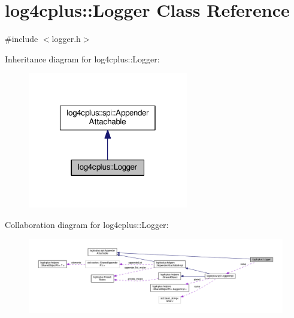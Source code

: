 \hypertarget{classlog4cplus_1_1Logger}{\section{log4cplus\-:\-:Logger Class Reference}
\label{classlog4cplus_1_1Logger}
}


{\ttfamily \#include $<$logger.\-h$>$}



Inheritance diagram for log4cplus\-:\-:Logger\-:
\nopagebreak
\begin{figure}[H]
\begin{center}
\leavevmode
\includegraphics[width=198pt]{classlog4cplus_1_1Logger__inherit__graph}
\end{center}
\end{figure}


Collaboration diagram for log4cplus\-:\-:Logger\-:
\nopagebreak
\begin{figure}[H]
\begin{center}
\leavevmode
\includegraphics[width=350pt]{classlog4cplus_1_1Logger__coll__graph}
\end{center}
\end{figure}
